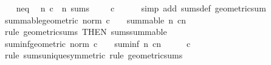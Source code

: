 \begin{isabellebody}
\ \ \isamarkupfalse%
\ neq{\isacharunderscore}{\kern0pt}{}\ \isamarkupfalse%
\ {\isachardoublequoteopen}{\isacharparenleft}{\kern0pt}{\isasymlambda}n{\isachardot}{\kern0pt}\ c\ {\isacharcircum}{\kern0pt}\ n{\isacharparenright}{\kern0pt}\ sums\ {\isacharparenleft}{\kern0pt}{}\ {\isacharslash}{\kern0pt}\ {\isacharparenleft}{\kern0pt}{}\ {\isacharminus}{\kern0pt}\ c{\isacharparenright}{\kern0pt}{\isacharparenright}{\kern0pt}{\isachardoublequoteclose}\isanewline
\ \ \ \ \isamarkupfalse%
\ {\isacharparenleft}{\kern0pt}simp\ add{\isacharcolon}{\kern0pt}\ sums{\isacharunderscore}{\kern0pt}def\ geometric{\isacharunderscore}{\kern0pt}sum{\isacharparenright}{\kern0pt}\isanewline
{}\isamarkupfalse%
%
\endisatagproof
{\isafoldproof}%
%
\isadelimproof
\isanewline
%
\endisadelimproof
\isanewline
{}\isamarkupfalse%
\ summable{\isacharunderscore}{\kern0pt}geometric{\isacharcolon}{\kern0pt}\ {\isachardoublequoteopen}norm\ c\ {\isacharless}{\kern0pt}\ {}\ {\isasymLongrightarrow}\ summable\ {\isacharparenleft}{\kern0pt}{\isasymlambda}n{\isachardot}{\kern0pt}\ c{\isacharcircum}{\kern0pt}n{\isacharparenright}{\kern0pt}{\isachardoublequoteclose}\isanewline
%
\isadelimproof
\ \ %
\endisadelimproof
%
\isatagproof
{}\isamarkupfalse%
\ {\isacharparenleft}{\kern0pt}rule\ geometric{\isacharunderscore}{\kern0pt}sums\ {\isacharbrackleft}{\kern0pt}THEN\ sums{\isacharunderscore}{\kern0pt}summable{\isacharbrackright}{\kern0pt}{\isacharparenright}{\kern0pt}%
\endisatagproof
{\isafoldproof}%
%
\isadelimproof
\isanewline
%
\endisadelimproof
\isanewline
{}\isamarkupfalse%
\ suminf{\isacharunderscore}{\kern0pt}geometric{\isacharcolon}{\kern0pt}\ {\isachardoublequoteopen}norm\ c\ {\isacharless}{\kern0pt}\ {}\ {\isasymLongrightarrow}\ suminf\ {\isacharparenleft}{\kern0pt}{\isasymlambda}n{\isachardot}{\kern0pt}\ c{\isacharcircum}{\kern0pt}n{\isacharparenright}{\kern0pt}\ {\isacharequal}{\kern0pt}\ {}\ {\isacharslash}{\kern0pt}\ {\isacharparenleft}{\kern0pt}{}\ {\isacharminus}{\kern0pt}\ c{\isacharparenright}{\kern0pt}{\isachardoublequoteclose}\isanewline
%
\isadelimproof
\ \ %
\endisadelimproof
%
\isatagproof
{}\isamarkupfalse%
\ {\isacharparenleft}{\kern0pt}rule\ sums{\isacharunderscore}{\kern0pt}unique{\isacharbrackleft}{\kern0pt}symmetric{\isacharbrackright}{\kern0pt}{\isacharparenright}{\kern0pt}\ {\isacharparenleft}{\kern0pt}rule\ geometric{\isacharunderscore}{\kern0pt}sums{\isacharparenright}{\kern0pt}%

\end{isabellebody}
